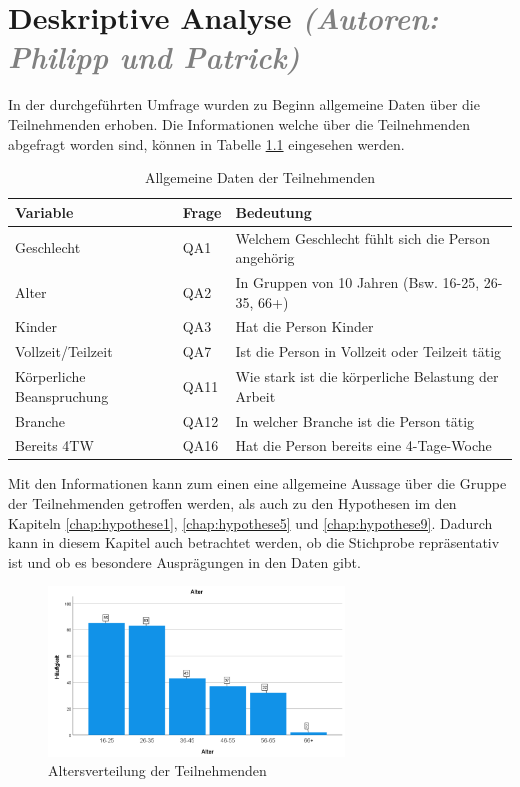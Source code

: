 \chapter{Deskriptive Analyse \textit{\textcolor{gray}{(Autoren: Philipp und Patrick)}}}

In der durchgeführten Umfrage wurden zu Beginn allgemeine Daten über die Teilnehmenden erhoben.
Die Informationen welche über die Teilnehmenden abgefragt worden sind, können in Tabelle
\ref{tab:allgemeine_daten} eingesehen werden.

\begin{table}[h]
    \centering
    \begin{tabular}{|l|l|p{8cm}|}
        \hline
        \textbf{Variable} & \textbf{Frage} & \textbf{Bedeutung}\\
        \hline
        Geschlecht & QA1 & Welchem Geschlecht fühlt sich die Person angehörig\\\hline
        Alter & QA2 & In Gruppen von 10 Jahren (Bsw. 16-25, 26-35, 66+)\\\hline
        Kinder & QA3 & Hat die Person Kinder\\\hline
        Vollzeit/Teilzeit & QA7 & Ist die Person in Vollzeit oder Teilzeit tätig\\\hline
        Körperliche Beanspruchung & QA11 & Wie stark ist die körperliche Belastung der Arbeit\\\hline
        Branche & QA12 & In welcher Branche ist die Person tätig\\\hline
        Bereits 4TW & QA16 & Hat die Person bereits eine 4-Tage-Woche\\\hline
    \end{tabular}
    \caption{Allgemeine Daten der Teilnehmenden}
    \label{tab:allgemeine_daten}
\end{table}

Mit den Informationen kann zum einen eine allgemeine Aussage über die Gruppe der Teilnehmenden 
getroffen werden, als auch zu den Hypothesen im den Kapiteln \ref{chap:hypothese1},
\ref{chap:hypothese5} und \ref{chap:hypothese9}. Dadurch kann in diesem Kapitel auch betrachtet
werden, ob die Stichprobe repräsentativ ist und ob es besondere Ausprägungen in den Daten gibt.

\begin{figure}[h]
    \centering
    \includegraphics[width=0.7\textwidth]{04_Artefakte/01_Abbildungen/deskriptiv_alter.png}
    \caption{Altersverteilung der Teilnehmenden}
    \label{fig:altersverteilung}
\end{figure}

